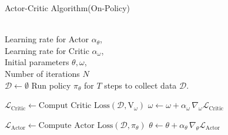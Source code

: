 \documentclass{article}
\begin{document}
\begin{algorithm}[t]
\caption{Actor-Critic Algorithm(On-Policy)}
\label{alg:actor-critic}
\begin{algorithmic}[1]

\REQUIRE 
  \,\\  
  Learning rate for Actor $\alpha_\theta$,\\
  Learning rate for Critic $\alpha_\omega$,\\
  Initial parameters $\theta, \omega$, \\
  Number of iterations $N$\\

\STATE $\mathcal{D} \leftarrow \emptyset$ 
  \STATE Run policy $\pi_\theta$ for $T$ steps to collect data $\mathcal{D}$.  

  \STATE $\mathcal{L}_\text{Critic} \leftarrow \text{Comput Critic Loss}(\mathcal{D}, \text{V}_\omega)$
  \STATE $\omega \leftarrow \omega + \alpha_\omega \,\nabla_{\omega} \mathcal{L}_\text{Critic}$

  \STATE $\mathcal{L}_\text{Actor} \leftarrow \text{Compute Actor Loss}(\mathcal{D}, \pi_\theta)$ 
  \STATE $\theta \leftarrow \theta + \alpha_\theta \,\nabla_{\theta} \mathcal{L}_\text{Actor}$

\ENDFOR

\end{algorithmic}
\end{algorithm}
\end{document}

